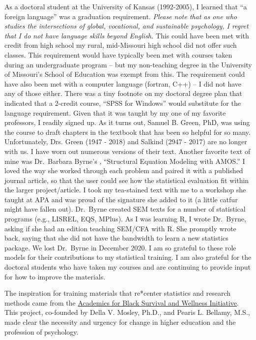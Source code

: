 \documentclass[
]{book}
\begin{document}
As a doctoral student at the University of Kansas (1992-2005), I learned that ``a foreign language'' was a graduation requirement. \emph{Please note that as one who studies the intersections of global, vocational, and sustainable psychology, I regret that I do not have language skills beyond English.} This could have been met with credit from high school my rural, mid-Missouri high school did not offer such classes. This requirement would have typically been met with courses taken during an undergraduate program -- but my non-teaching degree in the University of Missouri's School of Education was exempt from this. The requirement could have also been met with a computer language (fortran, C++) -- I did not have any of those either. There was a tiny footnote on my doctoral degree plan that indicated that a 2-credit course, ``SPSS for Windows'' would substitute for the language requirement. Given that it was taught by my one of my favorite professors, I readily signed up. As it turns out, Samuel B. Green, PhD, was using the course to draft chapters in the textbook \citep{green_using_2014} that has been so helpful for so many. Unfortunately, Drs. Green (1947 - 2018) and Salkind (2947 - 2017) are no longer with us. I have worn out numerous versions of their text. Another favorite text of mine was Dr.~Barbara Byrne's \citeyearpar{byrne_structural_2016}, ``Structural Equation Modeling with AMOS.'' I loved the way she worked through each problem and paired it with a published journal article, so that the user could see how the statistical evaluation fit within the larger project/article. I took my tea-stained text with me to a workshop she taught at APA and was proud of the signature she added to it (a little catfur might have fallen out). Dr.~Byrne created SEM texts for a number of statistical programs (e.g., LISREL, EQS, MPlus). As I was learning R, I wrote Dr.~Byrne, asking if she had an edition teaching SEM/CFA with R. She promptly wrote back, saying that she did not have the bandwidth to learn a new statistics package. We lost Dr.~Byrne in December 2020. I am so grateful to these role models for their contributions to my statistical training. I am also grateful for the doctoral students who have taken my courses and are continuing to provide input for how to improve the materials.

The inspiration for training materials that re*center statistics and research methods came from the \href{https://www.academics4blacklives.com/}{Academics for Black Survival and Wellness Initiative}. This project, co-founded by Della V. Mosley, Ph.D., and Pearis L. Bellamy, M.S., made clear the necessity and urgency for change in higher education and the profession of psychology.
\end{document}
